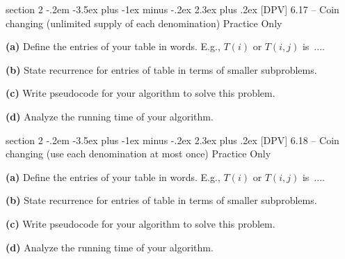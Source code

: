 \documentclass{article}
\makeatletter
\newenvironment{problem}{\@startsection
       {section}
       {2}
       {-.2em}
       {-3.5ex plus -1ex minus -.2ex}
       {2.3ex plus .2ex}
       {\pagebreak[3]%
       \large\bf\noindent{Problem }
       }
       }
\makeatother
\begin{document}
\begin{problem}{[DPV] 6.17 -- Coin changing (unlimited supply of each denomination) Practice Only}


{\bf (a) } Define the entries of your table in words.  E.g., $T(i)$ or $T(i,j)$ is~....

\vspace{3in}

{\bf (b) } State recurrence for entries of table in
terms of smaller subproblems.


\newpage

{\bf (c) }  Write pseudocode for your algorithm to solve this problem.

\vspace{4in}

{\bf (d) } Analyze the running time of your algorithm.

\end{problem}
 
\newpage

\begin{problem}{[DPV] 6.18 -- Coin changing (use each denomination at most once) Practice Only}


{\bf (a) } Define the entries of your table in words.  E.g., $T(i)$ or $T(i,j)$ is~....

\vspace{3in}

{\bf (b) } State recurrence for entries of table in
terms of smaller subproblems.


\newpage

{\bf (c) }  Write pseudocode for your algorithm to solve this problem.

\vspace{4in}

{\bf (d) } Analyze the running time of your algorithm.


 

\end{problem}
\end{document}
